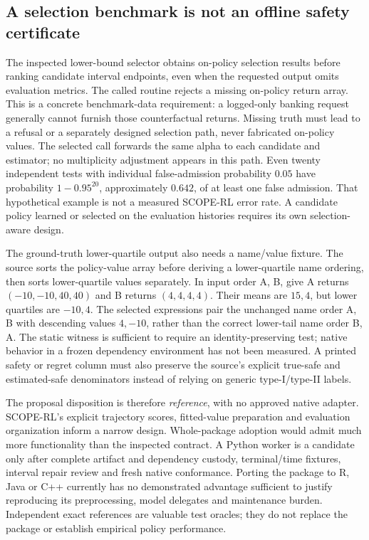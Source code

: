 \subsection{A selection benchmark is not an offline safety certificate}
\label{exec23:scope-rl-decision}
The inspected lower-bound selector obtains on-policy selection results before
ranking candidate interval endpoints, even when the requested output omits
evaluation metrics. The called routine rejects a missing on-policy return
array. This is a concrete benchmark-data requirement: a logged-only banking
request generally cannot furnish those counterfactual returns. Missing truth
must lead to a refusal or a separately designed selection path, never fabricated
on-policy values. The selected call forwards the same alpha to each candidate
and estimator; no multiplicity adjustment appears in this path. Even twenty
independent tests with individual false-admission probability $0.05$ have
probability $1-0.95^{20}$, approximately $0.642$, of at least one false admission.
That hypothetical example is not a measured SCOPE-RL error rate. A candidate
policy learned or selected on the evaluation histories requires its own
selection-aware design. \citep{exec23_scope_rl_sources,exec23_scope_rl_reference}

The ground-truth lower-quartile output also needs a name/value fixture. The
source sorts the policy-value array before deriving a lower-quartile name
ordering, then sorts lower-quartile values separately. In input order A, B,
give A returns $(-10,-10,40,40)$ and B returns $(4,4,4,4)$. Their means are
$15,4$, but lower quartiles are $-10,4$. The selected expressions pair the
unchanged name order A, B with descending values $4,-10$, rather than the
correct lower-tail name order B, A. The static witness is sufficient to require
an identity-preserving test; native behavior in a frozen dependency environment
has not been measured. A printed safety or regret column must also preserve the
source's explicit true-safe and estimated-safe denominators instead of relying
on generic type-I/type-II labels. \citep{exec23_scope_rl_sources,exec23_scope_rl_reference}

The proposal disposition is therefore \emph{reference}, with no approved native
adapter. SCOPE-RL's explicit trajectory scores, fitted-value preparation and
evaluation organization inform a narrow design. Whole-package adoption would
admit much more functionality than the inspected contract. A Python worker is
a candidate only after complete artifact and dependency custody, terminal/time
fixtures, interval repair review and fresh native conformance. Porting the
package to R, Java or C++ currently has no demonstrated advantage sufficient to
justify reproducing its preprocessing, model delegates and maintenance burden.
Independent exact references are valuable test oracles; they do not replace the
package or establish empirical policy performance.

